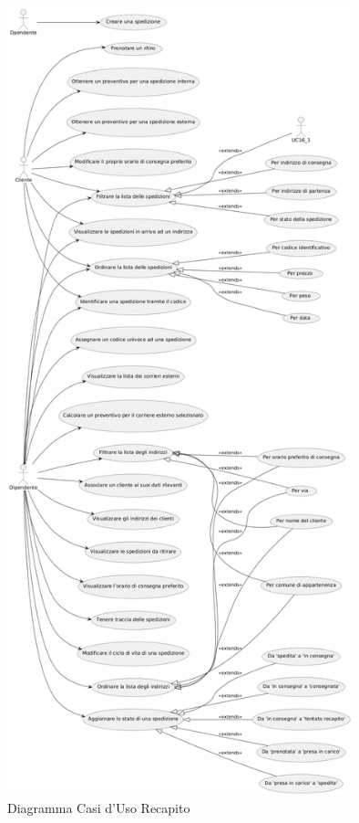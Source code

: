 \begin{figure}[H]
  \centering
  \includegraphics[width=10cm]{assets/usecase_recapito_1.png}
  \caption{Diagramma Casi d'Uso Recapito}
\end{figure}

